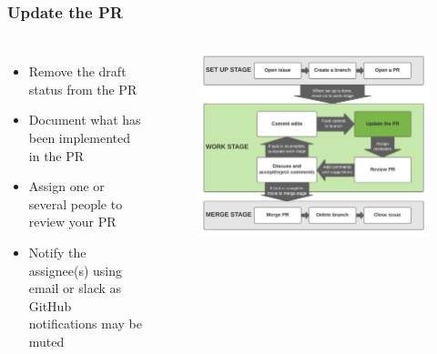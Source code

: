\documentclass[aspectratio=169]{beamer} %
\begin{document}
\begin{frame}
	\frametitle{Update the PR}
	\begin{columns}[c]
		
		\begin{itemize}
			\setlength\itemsep{1em}
			\item Remove the draft status from the PR
			\item Document what has been implemented in the PR
			\item Assign one or several people to review your PR
			\item Notify the assignee(s) using email or slack as GitHub notifications may be muted
		\end{itemize}
		
		\vspace{-.75cm}
		\begin{figure}
			\centering
			\includegraphics[width=\textwidth]{./img/branch-pr-merge-cycle-S2-2.png}
		\end{figure}
		
	\end{columns}
\end{frame}
\end{document}
